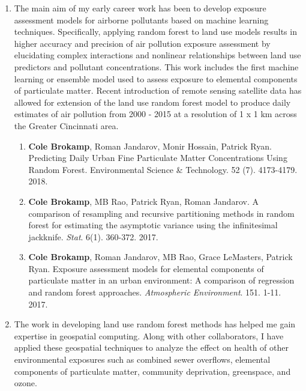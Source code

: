 \documentclass{nihbiosketch}
\begin{document}
\begin{enumerate}


\item The main aim of my early career work has been to develop exposure assessment models for airborne pollutants based on machine learning techniques.  Specifically, applying random forest to land use models results in higher accuracy and precision of air pollution exposure assessment by elucidating complex interactions and nonlinear relationships between land use predictors and pollutant concentrations. This work includes the first machine learning or ensemble model used to assess exposure to elemental components of particulate matter. Recent introduction of remote sensing satellite data has allowed for extension of the land use random forest model to produce daily estimates of air pollution from 2000 - 2015 at a resolution of 1 x 1 km across the Greater Cincinnati area.

\begin{enumerate}
	
	\item \textbf{Cole Brokamp}, Roman Jandarov, Monir Hossain, Patrick Ryan. Predicting Daily Urban Fine Particulate Matter Concentrations Using Random Forest. Environmental Science \& Technology. 52 (7). 4173-4179. 2018.
	
	\item \textbf{Cole Brokamp}, MB Rao, Patrick Ryan, Roman Jandarov. A comparison of resampling and recursive partitioning methods in random forest for estimating the asymptotic variance using the infinitesimal jackknife. \textit{Stat}. 6(1). 360-372. 2017.
	
	\item \textbf{Cole Brokamp}, Roman Jandarov, MB Rao, Grace LeMasters, Patrick Ryan. Exposure assessment models for elemental components of particulate matter in an urban environment: A comparison of regression and random forest approaches. \textit{Atmospheric Environment}. 151. 1-11. 2017.

\end{enumerate}

\item The work in developing land use random forest methods has helped me gain expertise in geospatial computing.  Along with other collaborators, I have applied these geospatial techniques to analyze the effect on health of other environmental exposures such as combined sewer overflows, elemental components of particulate matter, community deprivation, greenspace, and ozone.


\end{enumerate}
\end{document}
